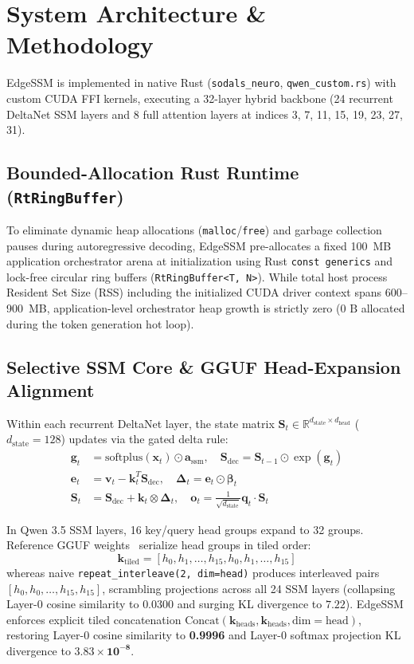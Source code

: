 \documentclass[journal]{IEEEtran}
\begin{document}
\section{System Architecture \& Methodology}

EdgeSSM is implemented in native Rust (\texttt{sodals\_neuro}, \texttt{qwen\_custom.rs}) with custom CUDA FFI kernels, executing a 32-layer hybrid backbone (24 recurrent DeltaNet SSM layers and 8 full attention layers at indices 3, 7, 11, 15, 19, 23, 27, 31).

\subsection{Bounded-Allocation Rust Runtime (\texttt{RtRingBuffer})}
To eliminate dynamic heap allocations (\texttt{malloc}/\texttt{free}) and garbage collection pauses during autoregressive decoding, EdgeSSM pre-allocates a fixed 100~MB application orchestrator arena at initialization using Rust \texttt{const generics} and lock-free circular ring buffers (\texttt{RtRingBuffer<T, N>}). While total host process Resident Set Size (RSS) including the initialized CUDA driver context spans 600--900~MB, application-level orchestrator heap growth is strictly zero ($0\text{ B}$ allocated during the token generation hot loop).

\subsection{Selective SSM Core \& GGUF Head-Expansion Alignment}
Within each recurrent DeltaNet layer, the state matrix $\mathbf{S}_t \in \mathbb{R}^{d_{\text{state}} \times d_{\text{head}}}$ ($d_{\text{state}} = 128$) updates via the gated delta rule:
\begin{align}
\mathbf{g}_t &= \mathrm{softplus}(\mathbf{x}_t) \odot \mathbf{a}_{\text{ssm}}, \quad \mathbf{S}_{\text{dec}} = \mathbf{S}_{t-1} \odot \exp(\mathbf{g}_t) \\
\mathbf{e}_t &= \mathbf{v}_t - \mathbf{k}_t^T \mathbf{S}_{\text{dec}}, \quad \mathbf{\Delta}_t = \mathbf{e}_t \odot \mathbf{\beta}_t \\
\mathbf{S}_t &= \mathbf{S}_{\text{dec}} + \mathbf{k}_t \otimes \mathbf{\Delta}_t, \quad \mathbf{o}_t = \frac{1}{\sqrt{d_{\text{state}}}} \mathbf{q}_t \cdot \mathbf{S}_t
\end{align}

In Qwen 3.5 SSM layers, 16 key/query head groups expand to 32 groups. Reference GGUF weights~\cite{gerganov2023llamacpp} serialize head groups in tiled order:
\begin{equation}
\mathbf{k}_{\text{tiled}} = [h_0, h_1, \dots, h_{15}, h_0, h_1, \dots, h_{15}]
\end{equation}
whereas naive \texttt{repeat\_interleave(2, dim=head)} produces interleaved pairs $[h_0, h_0, \dots, h_{15}, h_{15}]$, scrambling projections across all 24 SSM layers (collapsing Layer-0 cosine similarity to $0.0300$ and surging KL divergence to $7.22$). EdgeSSM enforces explicit tiled concatenation $\mathrm{Concat}(\mathbf{k}_{\text{heads}}, \mathbf{k}_{\text{heads}}, \text{dim}=\text{head})$, restoring Layer-0 cosine similarity to \textbf{0.9996} and Layer-0 softmax projection KL divergence to $\mathbf{3.83 \times 10^{-8}}$.
\end{document}
